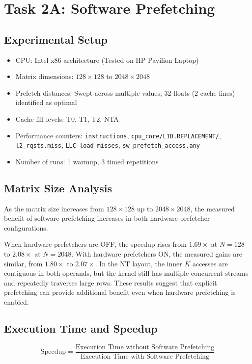 \section{Task 2A: Software Prefetching}

\subsection{Experimental Setup}
\begin{itemize}
    \item CPU: Intel x86 architecture (Tested on HP Pavilion Laptop)
    \item Matrix dimensions: $128 \times 128$ to $2048 \times 2048$
    \item Prefetch distances: Swept across multiple values; 32 floats (2 cache lines) identified as optimal
    \item Cache fill levels: T0, T1, T2, NTA
    \item Performance counters: \texttt{instructions}, \texttt{cpu\_core/L1D.REPLACEMENT/}, \texttt{l2\_rqsts.miss}, \texttt{LLC-load-misses}, \texttt{sw\_prefetch\_access.any}
    \item Number of runs: 1 warmup, 3 timed repetitions
\end{itemize}

\subsection{Matrix Size Analysis}
As the matrix size increases from $128 \times 128$ up to $2048 \times 2048$, the measured benefit of software prefetching increases in both hardware-prefetcher configurations.

When hardware prefetchers are OFF, the speedup rises from $1.69\times$ at $N=128$ to $2.08\times$ at $N=2048$. With hardware prefetchers ON, the measured gains are similar, from $1.80\times$ to $2.07\times$. In the NT layout, the inner $K$ accesses are contiguous in both operands, but the kernel still has multiple concurrent streams and repeatedly traverses large rows. These results suggest that explicit prefetching can provide additional benefit even when hardware prefetching is enabled.

\subsection{Execution Time and Speedup}
$$
\text{Speedup} =
\frac{\text{Execution Time without Software Prefetching}}
{\text{Execution Time with Software Prefetching}}
$$

